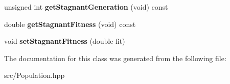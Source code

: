 \begin{DoxyCompactItemize}
$$\item 
\mbox{\label{class_indie_neat_1_1_population_1_1_species_a9c3ac1e5c035e05038b6e5e9494207c3}} 
unsigned int {\bfseries get\+Stagnant\+Generation} (void) const
\item 
\mbox{\label{class_indie_neat_1_1_population_1_1_species_a894ac24c374fb20f3413642568121a74}} 
double {\bfseries get\+Stagnant\+Fitness} (void) const
\item 
\mbox{\label{class_indie_neat_1_1_population_1_1_species_a619f58d475012bc8bce9a52dc3233b43}} 
void {\bfseries set\+Stagnant\+Fitness} (double fit)
\end{DoxyCompactItemize}


The documentation for this class was generated from the following file\+:\begin{DoxyCompactItemize}
\item 
src/Population.\+hpp\end{DoxyCompactItemize}
